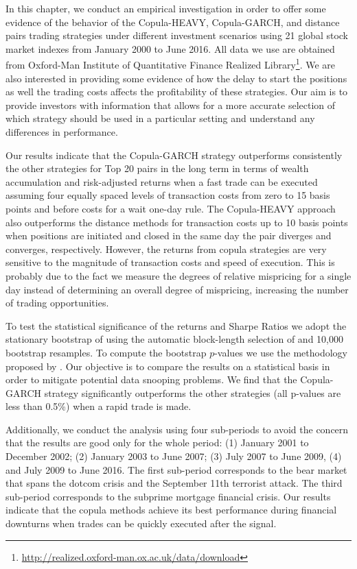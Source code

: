 \documentclass[a4paper,12pt]{report}
\begin{document}
\begin{refsection}
In this chapter, we conduct an empirical investigation in order to offer some evidence of the behavior of the Copula-HEAVY, Copula-GARCH, and distance pairs trading strategies under different investment scenarios using 21 global stock market indexes from January 2000 to June 2016. All data we use are obtained from Oxford-Man Institute of Quantitative Finance Realized Library\footnote{\url{http://realized.oxford-man.ox.ac.uk/data/download}}. We are also interested in providing some evidence of how the delay to start the positions as well the trading costs affects the profitability of these strategies. Our aim is to provide investors with information that allows for a more accurate selection of which strategy should be used in a particular setting and understand any differences in performance.

Our results indicate that the Copula-GARCH strategy outperforms consistently the other strategies for Top 20 pairs in the long term in terms of wealth accumulation and risk-adjusted returns when a fast trade can be executed assuming four equally spaced levels of transaction costs from zero to 15 basis points and before costs for a wait one-day rule. The Copula-HEAVY approach also outperforms the distance methods for transaction costs up to 10 basis points when positions are initiated and closed in the same day the pair diverges and converges, respectively. However, the returns from copula strategies are very sensitive to the magnitude of transaction costs and speed of execution. This is probably due to the fact we measure the degrees of relative mispricing for a single day instead of determining an overall degree of mispricing, increasing the number of trading opportunities.

To test the statistical significance of the returns and Sharpe Ratios we adopt the stationary bootstrap of \citet*{pr94} using the automatic block-length selection of \citet*{pw04} and 10,000 bootstrap resamples. To compute the bootstrap $p$-values we use the methodology proposed by \citet*{lw08}. Our objective is to compare the results on a statistical basis in order to mitigate potential data snooping problems. We find that the Copula-GARCH strategy significantly outperforms the other strategies (all p-values are less than 0.5\%) when a rapid trade is made.

Additionally, we conduct the analysis using four sub-periods to avoid the concern that the results are good only for the whole period: (1) January 2001 to December 2002; (2) January 2003 to June 2007; (3) July 2007 to June 2009, (4) and July 2009 to June 2016. The first sub-period corresponds to the bear market that spans the dotcom crisis and the September 11th terrorist attack. The third sub-period corresponds to the subprime mortgage financial crisis. Our results indicate that the copula methods achieve its best performance during financial downturns when trades can be quickly executed after the signal.


\end{refsection}
\end{document}
